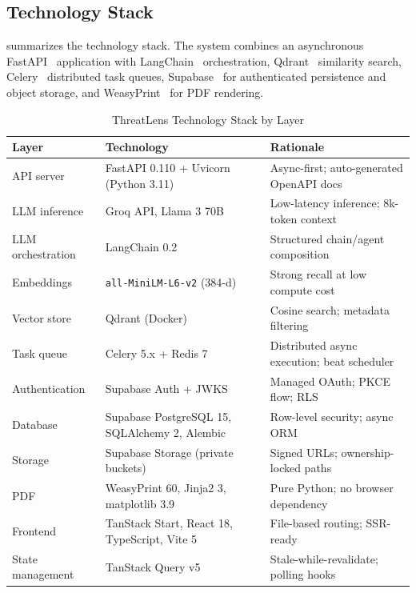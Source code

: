 \documentclass[conference]{IEEEtran}
\newcommand{\tsz}{\footnotesize}
\begin{document}
\subsection{Technology Stack}
 summarizes the technology stack. The system combines an
asynchronous FastAPI~\cite{fastapi} application with LangChain~\cite{langchain}
orchestration, Qdrant~\cite{qdrant} similarity search, Celery~\cite{celery}
distributed task queues, Supabase~\cite{supabase} for authenticated persistence
and object storage, and WeasyPrint~\cite{weasyprint} for PDF rendering.

\begin{table}[!t]
\caption{ThreatLens Technology Stack by Layer}
\label{tab:stack}
\centering\tsz
\renewcommand{\arraystretch}{1.1}
\begin{tabularx}{\textwidth}{@{}lXX@{}}
\toprule
\textbf{Layer} & \textbf{Technology} & \textbf{Rationale}\\
\midrule
API server        & FastAPI 0.110 + Uvicorn (Python 3.11) & Async-first; auto-generated OpenAPI docs\\
LLM inference     & Groq API, Llama 3 70B & Low-latency inference; 8k-token context\\
LLM orchestration & LangChain 0.2 & Structured chain/agent composition\\
Embeddings        & \texttt{all-MiniLM-L6-v2} (384-d) & Strong recall at low compute cost\\
Vector store      & Qdrant (Docker) & Cosine search; metadata filtering\\
Task queue        & Celery 5.x + Redis 7 & Distributed async execution; beat scheduler\\
Authentication    & Supabase Auth + JWKS & Managed OAuth; PKCE flow; RLS\\
Database          & Supabase PostgreSQL 15, SQLAlchemy 2, Alembic & Row-level security; async ORM\\
Storage           & Supabase Storage (private buckets) & Signed URLs; ownership-locked paths\\
PDF               & WeasyPrint 60, Jinja2 3, matplotlib 3.9 & Pure Python; no browser dependency\\
Frontend          & TanStack Start, React 18, TypeScript, Vite 5 & File-based routing; SSR-ready\\
State management  & TanStack Query v5 & Stale-while-revalidate; polling hooks\\
\bottomrule
\end{tabularx}
\end{table}
\end{document}

